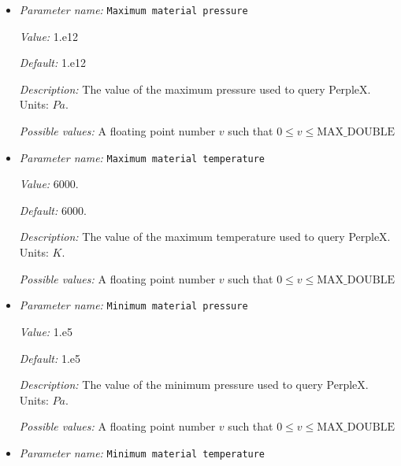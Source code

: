 \begin{itemize}
\item {\it Parameter name:} {\tt Maximum material pressure}
\label{parameters:Material model/PerpleX lookup model/Maximum material pressure}
\label{parameters:Material_20model/PerpleX_20lookup_20model/Maximum_20material_20pressure}


{\it Value:} 1.e12


{\it Default:} 1.e12


{\it Description:} The value of the maximum pressure used to query PerpleX. Units: $Pa$.


{\it Possible values:} A floating point number $v$ such that $0 \leq v \leq \text{MAX\_DOUBLE}$
\item {\it Parameter name:} {\tt Maximum material temperature}
\label{parameters:Material model/PerpleX lookup model/Maximum material temperature}
\label{parameters:Material_20model/PerpleX_20lookup_20model/Maximum_20material_20temperature}


{\it Value:} 6000.


{\it Default:} 6000.


{\it Description:} The value of the maximum temperature used to query PerpleX. Units: $K$.


{\it Possible values:} A floating point number $v$ such that $0 \leq v \leq \text{MAX\_DOUBLE}$
\item {\it Parameter name:} {\tt Minimum material pressure}
\label{parameters:Material model/PerpleX lookup model/Minimum material pressure}
\label{parameters:Material_20model/PerpleX_20lookup_20model/Minimum_20material_20pressure}


{\it Value:} 1.e5


{\it Default:} 1.e5


{\it Description:} The value of the minimum pressure used to query PerpleX. Units: $Pa$.


{\it Possible values:} A floating point number $v$ such that $0 \leq v \leq \text{MAX\_DOUBLE}$
\item {\it Parameter name:} {\tt Minimum material temperature}
\label{parameters:Material model/PerpleX lookup model/Minimum material temperature}
\label{parameters:Material_20model/PerpleX_20lookup_20model/Minimum_20material_20temperature}



\end{itemize}
